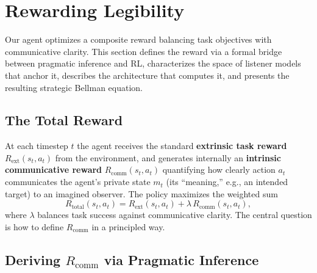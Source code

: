 \documentclass{article}
\newcommand{\Rcomm}{R_{\text{comm}}}
\newcommand{\Rext}{R_{\text{ext}}}
\newcommand{\Rtotal}{R_{\text{total}}}
\begin{document}
\section{Rewarding Legibility}
\label{sec:pragmatic_reward}

Our agent optimizes a composite reward balancing task objectives with communicative clarity. This section defines the reward via a formal bridge between pragmatic inference and RL, characterizes the space of listener models that anchor it, describes the architecture that computes it, and presents the resulting strategic Bellman equation.

\subsection{The Total Reward}
\label{ssec:total_reward}

At each timestep $t$ the agent receives the standard \textbf{extrinsic task reward} $\Rext(s_t,a_t)$ from the environment, and generates internally an \textbf{intrinsic communicative reward} $\Rcomm(s_t,a_t)$ quantifying how clearly action $a_t$ communicates the agent's private state $m_t$ (its ``meaning,'' e.g., an intended target) to an imagined observer. The policy maximizes the weighted sum
\begin{equation}
\Rtotal(s_t, a_t) = \Rext(s_t, a_t) + \lambda\, \Rcomm(s_t, a_t), \label{eq:total_reward}
\end{equation}
where $\lambda$ balances task success against communicative clarity. The central question is how to define $\Rcomm$ in a principled way.

\subsection{Deriving $\Rcomm$ via Pragmatic Inference}
\label{ssec:reward_derivation}
\end{document}
